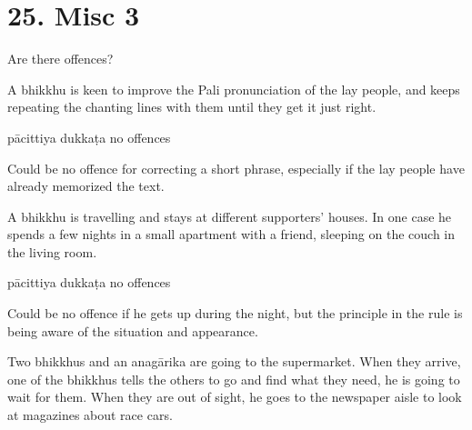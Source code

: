 \chapter{25. Misc 3}
\renewcommand*{\theChapterTitle}{25. Misc 3}

\begin{exam}{\autoExamName}

  \begin{problem*}

    Are there offences?

    \begin{parts}

      \item A bhikkhu is keen to improve the Pali pronunciation of the lay
      people, and keeps repeating the chanting lines with them until they get it
      just right.

      \bigskip

      \begin{answers}{3}
        \bChoices
         pācittiya\eAns
         dukkaṭa\eAns
         no offences\eAns
        \eChoices
      \end{answers}

      \begin{solution}
        Could be no offence for correcting a short phrase, especially if the lay people have already memorized the text.
      \end{solution}

      \bigskip

      \item A bhikkhu is travelling and stays at different supporters' houses.
      In one case he spends a few nights in a small apartment with a friend,
      sleeping on the couch in the living room.

      \bigskip

      \begin{answers}{3}
        \bChoices
         pācittiya\eAns
         dukkaṭa\eAns
         no offences\eAns
        \eChoices
      \end{answers}

      \begin{solution}
        Could be no offence if he gets up during the night, but the principle in
        the rule is being aware of the situation and appearance.
      \end{solution}

      \bigskip

      \item Two bhikkhus and an anagārika are going to the supermarket. When
      they arrive, one of the bhikkhus tells the others to go and find what they
      need, he is going to wait for them. When they are out of sight, he goes to
      the newspaper aisle to look at magazines about race cars.


\end{parts}
\end{problem*}
\end{exam}
